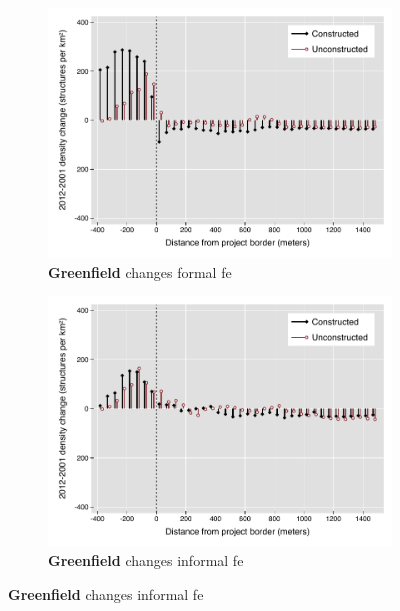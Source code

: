 \documentclass[12pt]{article}
\begin{document}
\begin{figure}
\begin{subfigure}[b]{0.48\textwidth}
        \end{subfigure}
        \begin{subfigure}[b]{0.48\textwidth}
                    \caption[Network2]%
            {{\footnotesize \textbf{Greenfield} changes formal  fe}}    
            \label{fig:prefor}
            \centering
            \includegraphics[width=\textwidth,trim={0.3cm .3cm 0.1cm 0cm}, clip=true]{figures/bblu_for_fe_rawchanges_4_1_sp_postk.pdf}

        \end{subfigure}
        \hfill
        \begin{subfigure}[b]{0.48\textwidth}  
                    \caption[]%
            {{\footnotesize \textbf{Greenfield} changes informal fe}}     
            \label{fig:preinf}
            \centering 
            \includegraphics[width=\textwidth,trim={0.3cm .3cm 0.1cm 0cm}, clip=true]{figures/bblu_inf_fe_rawchanges_4_1_sp_postk.pdf}


\end{subfigure}
\end{figure}
\end{document}
